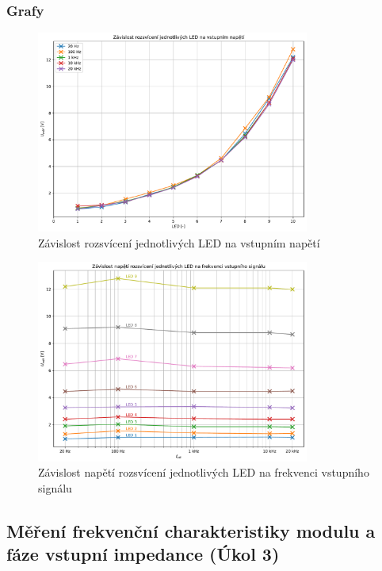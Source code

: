 \documentclass[a4paper, czech]{article}
\begin{document}
\subsubsection{Grafy}

\begin{figure}[H]
    \centering
    \includegraphics[width=0.8\textwidth]{grafy/graf1.pdf}
    \caption{Závislost rozsvícení jednotlivých LED na vstupním napětí}
\end{figure}

\begin{figure}[H]
    \centering
    \includegraphics[width=0.8\textwidth]{grafy/graf2.pdf}
    \caption{Závislost napětí rozsvícení jednotlivých LED na frekvenci vstupního signálu}
\end{figure}

\subsection{Měření frekvenční charakteristiky modulu a fáze vstupní impedance (Úkol 3)}
\end{document}
